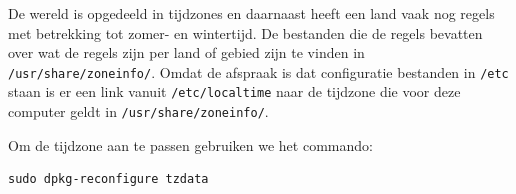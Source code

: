 De wereld is opgedeeld in tijdzones en daarnaast heeft een land vaak nog regels met betrekking tot zomer- en wintertijd. De bestanden die de regels bevatten over wat de regels zijn per land of gebied zijn te vinden in \texttt{/usr/share/zoneinfo/}. Omdat de afspraak is dat configuratie bestanden in \texttt{/etc} staan is er een link vanuit \texttt{/etc/localtime} naar de tijdzone die voor deze computer geldt in \texttt{/usr/share/zoneinfo/}.

Om de tijdzone aan te passen gebruiken we het commando:
\begin{lstlisting}
sudo dpkg-reconfigure tzdata
\end{lstlisting}

